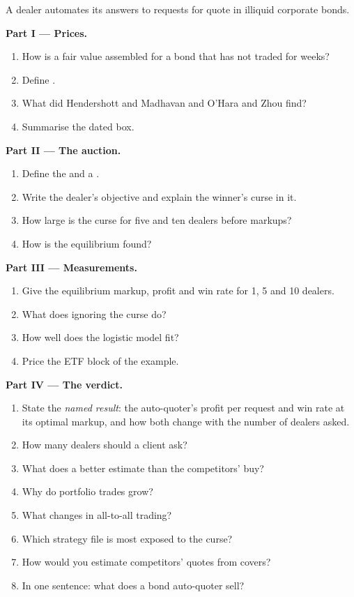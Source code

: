\begin{problem}\label{pb:hf:bond-and-etf-request-for-quote-market-making:1}
A dealer automates its answers to requests for quote in illiquid corporate bonds.

\medskip\noindent\textbf{Part I --- Prices.}
\begin{enumerate}
\item How is a fair value assembled for a bond that has not traded for weeks?
\item Define .
\item What did Hendershott and Madhavan and O'Hara and Zhou find?
\item Summarise the dated box.
\end{enumerate}

\medskip\noindent\textbf{Part II --- The auction.}
\begin{enumerate}[resume]
\item Define the  and a .
\item Write the dealer's objective and explain the winner's curse in it.
\item How large is the curse for five and ten dealers before markups?
\item How is the equilibrium found?
\end{enumerate}

\medskip\noindent\textbf{Part III --- Measurements.}
\begin{enumerate}[resume]
\item Give the equilibrium markup, profit and win rate for 1, 5 and 10 dealers.
\item What does ignoring the curse do?
\item How well does the logistic model fit?
\item Price the ETF block of the example.
\end{enumerate}

\medskip\noindent\textbf{Part IV --- The verdict.}
\begin{enumerate}[resume]
\item State the \emph{named result}: the auto-quoter's profit per request and win rate at its optimal markup, and how both change with the number of
dealers asked.
\item How many dealers should a client ask?
\item What does a better estimate than the competitors' buy?
\item Why do portfolio trades grow?
\item What changes in all-to-all trading?
\item Which strategy file is most exposed to the curse?
\item How would you estimate competitors' quotes from covers?
\item In one sentence: what does a bond auto-quoter sell?
\end{enumerate}
\end{problem}

